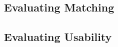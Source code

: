 
\subsection{Evaluating Matching}
\label{sec:evaluating-matching}


\subsection{Evaluating Usability}
\label{sec:evaluating-usability}


